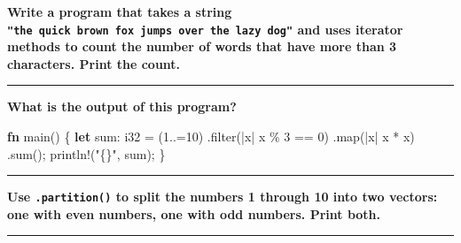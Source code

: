 \documentclass[
  11pt,
]{article}
\newenvironment{Shaded}{}{}
\newcommand{\DataTypeTok}[1]{\textcolor[rgb]{0.56,0.13,0.00}{#1}}
\newcommand{\DecValTok}[1]{\textcolor[rgb]{0.25,0.63,0.44}{#1}}
\newcommand{\KeywordTok}[1]{\textcolor[rgb]{0.00,0.44,0.13}{\textbf{#1}}}
\newcommand{\NormalTok}[1]{#1}
\newcommand{\OperatorTok}[1]{\textcolor[rgb]{0.40,0.40,0.40}{#1}}
\newcommand{\PreprocessorTok}[1]{\textcolor[rgb]{0.74,0.48,0.00}{#1}}
\newcommand{\StringTok}[1]{\textcolor[rgb]{0.25,0.44,0.63}{#1}}
\begin{document}
\textbf{Write a program that takes a string
\texttt{"the\ quick\ brown\ fox\ jumps\ over\ the\ lazy\ dog"} and uses
iterator methods to count the number of words that have more than 3
characters. Print the count.}

\begin{Shaded}
\begin{Highlighting}[]

\end{Highlighting}
\end{Shaded}

\begin{center}\rule{0.5\linewidth}{0.5pt}\end{center}

\textbf{What is the output of this program?}

\begin{Shaded}
\begin{Highlighting}[]
\KeywordTok{fn}\NormalTok{ main() }\OperatorTok{\{}
    \KeywordTok{let}\NormalTok{ sum}\OperatorTok{:} \DataTypeTok{i32} \OperatorTok{=}\NormalTok{ (}\DecValTok{1}\OperatorTok{..=}\DecValTok{10}\NormalTok{)}
        \OperatorTok{.}\NormalTok{filter(}\OperatorTok{|}\NormalTok{x}\OperatorTok{|}\NormalTok{ x }\OperatorTok{\%} \DecValTok{3} \OperatorTok{==} \DecValTok{0}\NormalTok{)}
        \OperatorTok{.}\NormalTok{map(}\OperatorTok{|}\NormalTok{x}\OperatorTok{|}\NormalTok{ x }\OperatorTok{*}\NormalTok{ x)}
        \OperatorTok{.}\NormalTok{sum()}\OperatorTok{;}
    \PreprocessorTok{println!}\NormalTok{(}\StringTok{"\{\}"}\OperatorTok{,}\NormalTok{ sum)}\OperatorTok{;}
\OperatorTok{\}}
\end{Highlighting}
\end{Shaded}

\begin{center}\rule{0.5\linewidth}{0.5pt}\end{center}

\textbf{Use \texttt{.partition()} to split the numbers 1 through 10 into
two vectors: one with even numbers, one with odd numbers. Print both.}

\begin{Shaded}
\begin{Highlighting}[]

\end{Highlighting}
\end{Shaded}

\begin{center}\rule{0.5\linewidth}{0.5pt}\end{center}
\end{document}
